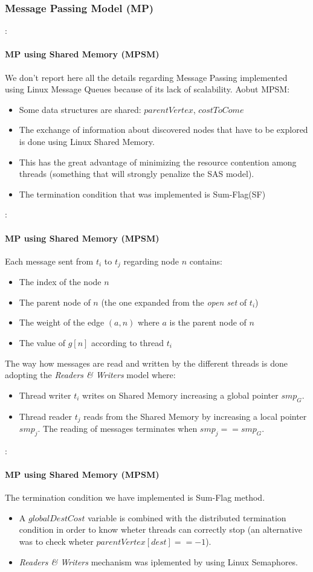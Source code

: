\documentclass[12pt]{beamer}
\begin{document}
	\subsubsection{Message Passing Model (MP)}
	\begin{frame}{\secname : \subsecname}
		\framesubtitle{MP using Shared Memory (MPSM)}
		We don't report here all the details regarding Message Passing implemented using Linux Message Queues
		because of its lack of scalability. Aobut MPSM:
		\begin{itemize}
			\item Some data structures are shared: $parentVertex$, $costToCome$
			\item The exchange of information about discovered nodes that have to be explored is done
				  using Linux Shared Memory.
			\item This has the great advantage of minimizing the resource contention among threads 
			      (something that will strongly penalize the SAS model).
			\item The termination condition that was implemented is Sum-Flag(SF)
		\end{itemize}
	\end{frame}
	\begin{frame}{\secname : \subsecname}
		\framesubtitle{MP using Shared Memory (MPSM)}
		Each message sent from $t_i$ to $t_j$ regarding node $n$ contains:
		\begin{itemize}
			\item The index of the node $n$
			\item The parent node of $n$ (the one expanded from the \textit{open set} of $t_i$)
			\item The weight of the edge $(a, n)$ where $a$ is the parent node of $n$
			\item The value of $g[n]$ according to thread $t_i$
		\end{itemize}
		The way how messages are read and written by the different threads is done adopting the \textit{Readers \& Writers}
		model where:
		\begin{itemize}
		\item Thread writer $t_i$ writes on Shared Memory increasing a global pointer $smp_G$.
		\item Thread reader $t_j$ reads from the Shared Memory by increasing a local pointer $smp_j$. The reading
				of messages terminates when $smp_j == smp_G$.
		\end{itemize}
	\end{frame}
	\begin{frame}{\secname : \subsecname}
		\framesubtitle{MP using Shared Memory (MPSM)}
		The termination condition we have implemented is Sum-Flag method.
		\begin{itemize}
			\item A $globalDestCost$ variable is combined with the distributed
				  termination condition in order to know wheter threads can correctly stop (an
				  alternative was to check wheter $parentVertex[dest]==-1$).
			\item \textit{Readers \& Writers} mechanism was iplemented by using Linux Semaphores.
		\end{itemize}
	\end{frame}
\end{document}

